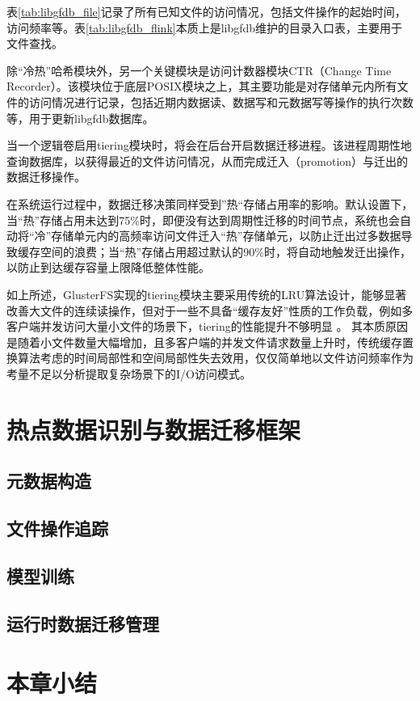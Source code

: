 表\ref{tab:libgfdb_file}记录了所有已知文件的访问情况，包括文件操作的起始时间，访问频率等。表\ref{tab:libgfdb_flink}本质上是libgfdb维护的目录入口表，主要用于文件查找。

除“冷热”哈希模块外，另一个关键模块是访问计数器模块CTR（Change Time Recorder）。该模块位于底层POSIX模块之上，其主要功能是对存储单元内所有文件的访问情况进行记录，包括近期内数据读、数据写和元数据写等操作的执行次数等，用于更新libgfdb数据库。

当一个逻辑卷启用tiering模块时，将会在后台开启数据迁移进程。该进程周期性地查询数据库，以获得最近的文件访问情况，从而完成{\color{orange}迁入}（promotion）与{\color{orange}迁出}的数据迁移操作。

在系统运行过程中，数据迁移决策同样受到”热“存储占用率的影响。默认设置下，当“热”存储占用未达到75\%时，即便没有达到周期性迁移的时间节点，系统也会自动将“冷”存储单元内的高频率访问文件迁入“热”存储单元，以防止迁出过多数据导致缓存空间的浪费；当“热”存储占用超过默认的90\%时，将自动地触发迁出操作，以防止到达缓存容量上限降低整体性能。

如上所述，GlusterFS实现的tiering模块主要采用传统的LRU算法设计，能够显著改善大文件的连续读操作，但对于一些不具备“缓存友好”性质的工作负载，例如多客户端并发访问大量小文件的场景下，tiering的性能提升不够明显
\cite{Red_Hat_Gluster_storage_on_supermicro_storage_servers_powered_by_Intel_Xeon_processors}。
其本质原因是随着小文件数量大幅增加，且多客户端的并发文件请求数量上升时，传统缓存置换算法考虑的时间局部性和空间局部性失去效用，仅仅简单地以文件访问频率作为考量不足以分析提取复杂场景下的I/O访问模式。


\section{热点数据识别与数据迁移框架}
\subsection{元数据构造}
\subsection{文件操作追踪}
\subsection{模型训练}
\subsection{运行时数据迁移管理}

\section{本章小结}
